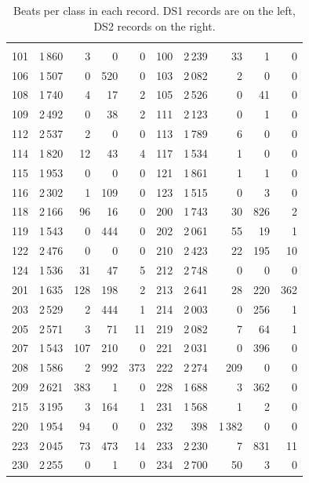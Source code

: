\begin{table}[H]
  \centering
  \caption{Beats per class in each record. DS1 records are on the left, DS2 records on the right.}
  \label{tab:class-per-record}
  \begin{tabularx}{\linewidth}{YRRRRYRRRR}
     &  &  &  &  &  &  &  &  &  \\
    101 & 1\,860 & 3 & 0 & 0 & 100 & 2\,239 & 33 & 1 & 0 \\
    106 & 1\,507 & 0 & 520 & 0 & 103 & 2\,082 & 2 & 0 & 0 \\
    108 & 1\,740 & 4 & 17 & 2 & 105 & 2\,526 & 0 & 41 & 0 \\
    109 & 2\,492 & 0 & 38 & 2 & 111 & 2\,123 & 0 & 1 & 0 \\
    112 & 2\,537 & 2 & 0 & 0 & 113 & 1\,789 & 6 & 0 & 0 \\
    114 & 1\,820 & 12 & 43 & 4 & 117 & 1\,534 & 1 & 0 & 0 \\
    115 & 1\,953 & 0 & 0 & 0 & 121 & 1\,861 & 1 & 1 & 0 \\
    116 & 2\,302 & 1 & 109 & 0 & 123 & 1\,515 & 0 & 3 & 0 \\
    118 & 2\,166 & 96 & 16 & 0 & 200 & 1\,743 & 30 & 826 & 2 \\
    119 & 1\,543 & 0 & 444 & 0 & 202 & 2\,061 & 55 & 19 & 1 \\
    122 & 2\,476 & 0 & 0 & 0 & 210 & 2\,423 & 22 & 195 & 10 \\
    124 & 1\,536 & 31 & 47 & 5 & 212 & 2\,748 & 0 & 0 & 0 \\
    201 & 1\,635 & 128 & 198 & 2 & 213 & 2\,641 & 28 & 220 & 362 \\
    203 & 2\,529 & 2 & 444 & 1 & 214 & 2\,003 & 0 & 256 & 1 \\
    205 & 2\,571 & 3 & 71 & 11 & 219 & 2\,082 & 7 & 64 & 1 \\
    207 & 1\,543 & 107 & 210 & 0 & 221 & 2\,031 & 0 & 396 & 0 \\
    208 & 1\,586 & 2 & 992 & 373 & 222 & 2\,274 & 209 & 0 & 0 \\
    209 & 2\,621 & 383 & 1 & 0 & 228 & 1\,688 & 3 & 362 & 0 \\
    215 & 3\,195 & 3 & 164 & 1 & 231 & 1\,568 & 1 & 2 & 0 \\
    220 & 1\,954 & 94 & 0 & 0 & 232 & 398 & 1\,382 & 0 & 0 \\
    223 & 2\,045 & 73 & 473 & 14 & 233 & 2\,230 & 7 & 831 & 11 \\
    230 & 2\,255 & 0 & 1 & 0 & 234 & 2\,700 & 50 & 3 & 0 \\
    \bottomrule
  \end{tabularx}
\end{table}
